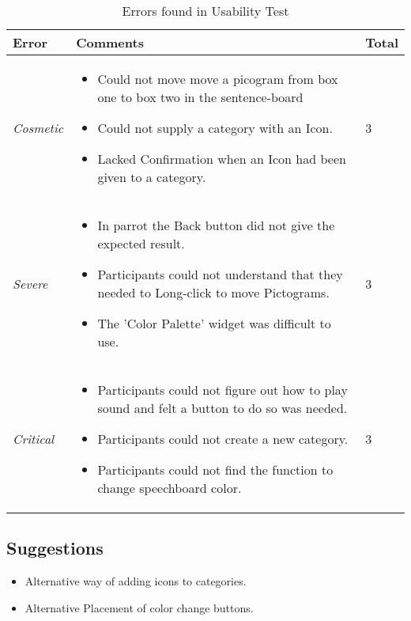 \begin{table}
	\centering
		\begin{tabular}{l | l | l}
		\hline
			\textbf{Error} & \textbf{Comments} & Total\\
		\hline
			\textit{Cosmetic} & \begin{itemize} 
														\item Could not move move a picogram from box one to box two in the sentence-board
														\item Could not supply a category with an Icon.
														\item Lacked Confirmation when an Icon had been given to a category.
													\end{itemize} & 3 \\
		\hline
			\textit{Severe} & \begin{itemize}
													\item In parrot the Back button did not give the expected result.
													\item Participants could not understand that they needed to Long-click to move Pictograms.
													\item The 'Color Palette' widget was difficult to use.
												\end{itemize} & 3 \\
		\hline
			\textit{Critical} & \begin{itemize}
														\item Participants could not figure out how to play sound and felt a button to do so was needed.
														\item Participants could not create a new category.
														\item Participants could not find the function to change speechboard color.
													\end{itemize} & 3 \\
		\hline
		\end{tabular}
	\caption{Errors found in Usability Test}
	\label{tab:ErrorsFoundInUsabilityTest}
\end{table}

\subsection{Suggestions}
\begin{itemize}
	\item Alternative way of adding icons to categories.
	\item Alternative Placement of color change buttons. 
\end{itemize}